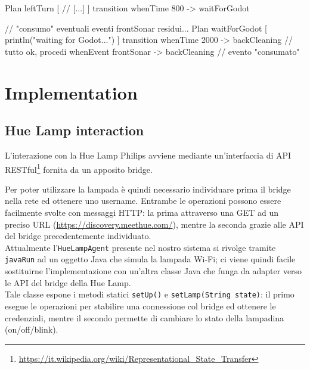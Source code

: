 \documentclass{../llncs}
\newcommand{\codescript}[1]{{\mbox{\small{\texttt{#1}}}}\xspace}
\newcommand{\labelsec}[1]{\label{sec:#1}}
\begin{document}
\begin{qacode}[caption={SoftwareAgent, pt13}]
Plan leftTurn [
	// [...]
]
transition
	whenTime 800 -> waitForGodot

// "consumo" eventuali eventi frontSonar residui...
Plan waitForGodot [
	println("waiting for Godot...")
]
transition
	whenTime 2000 -> backCleaning // tutto ok, procedi
	whenEvent frontSonar -> backCleaning // evento "consumato"
\end{qacode}

\section{Implementation}
\labelsec{Implementation}

\subsection{Hue Lamp interaction}
L'interazione con la Hue Lamp Philips avviene mediante un'interfaccia di API RESTful\footnote{\url{https://it.wikipedia.org/wiki/Representational_State_Transfer}} fornita da un apposito bridge.

Per poter utilizzare la lampada è quindi necessario individuare prima il bridge nella rete ed ottenere uno username. Entrambe le operazioni possono essere facilmente svolte con messaggi HTTP: la prima attraverso una GET ad un preciso URL (\url{https://discovery.meethue.com/}), mentre la seconda grazie alle API del bridge precedentemente individuato.\\

Attualmente l'\codescript{HueLampAgent} presente nel nostro sistema si rivolge tramite \codescript{javaRun} ad un oggetto Java che simula la lampada Wi-Fi; ci viene quindi facile sostituirne l'implementazione con un'altra classe Java che funga da adapter verso le API del bridge della Hue Lamp.\\



Tale classe espone i metodi statici \codescript{setUp()} e \codescript{setLamp(String state)}: il primo esegue le operazioni per stabilire una connessione col bridge ed ottenere le credenziali, mentre il secondo permette di cambiare lo stato della lampadina (on/off/blink).\\
\end{document}
